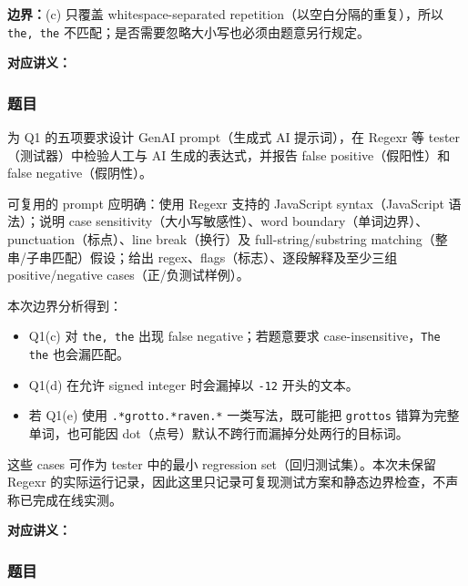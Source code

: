 \textbf{边界：}(c) 只覆盖 whitespace-separated repetition（以空白分隔的重复），所以 \texttt{the, the} 不匹配；是否需要忽略大小写也必须由题意另行规定。


\textbf{对应讲义：}

\subsubsection*{题目}

为 Q1 的五项要求设计 GenAI prompt（生成式 AI 提示词），在 Regexr 等 tester（测试器）中检验人工与 AI 生成的表达式，并报告 false positive（假阳性）和 false negative（假阴性）。

\begin{checkedsolution}
可复用的 prompt 应明确：使用 Regexr 支持的 JavaScript syntax（JavaScript 语法）；说明 case sensitivity（大小写敏感性）、word boundary（单词边界）、punctuation（标点）、line break（换行）及 full-string/substring matching（整串/子串匹配）假设；给出 regex、flags（标志）、逐段解释及至少三组 positive/negative cases（正/负测试样例）。

本次边界分析得到：
\begin{itemize}[leftmargin=2em]
  \item Q1(c) 对 \texttt{the, the} 出现 false negative；若题意要求 case-insensitive，\texttt{The the} 也会漏匹配。
  \item Q1(d) 在允许 signed integer 时会漏掉以 \texttt{-12} 开头的文本。
  \item 若 Q1(e) 使用 \verb|.*grotto.*raven.*| 一类写法，既可能把 \texttt{grottos} 错算为完整单词，也可能因 dot（点号）默认不跨行而漏掉分处两行的目标词。
\end{itemize}
这些 cases 可作为 tester 中的最小 regression set（回归测试集）。本次未保留 Regexr 的实际运行记录，因此这里只记录可复现测试方案和静态边界检查，不声称已完成在线实测。
\end{checkedsolution}


\textbf{对应讲义：}

\subsubsection*{题目}


